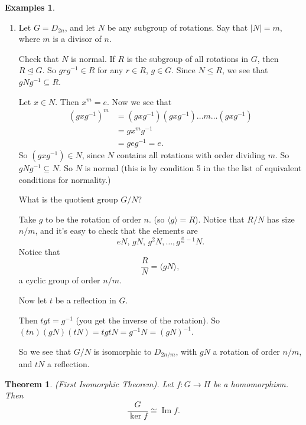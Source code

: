 \documentclass{article}
\newtheorem{theorem}{Theorem}
\theoremstyle{definition}
\newtheorem*{exmps}{Examples}
\newcommand{\gene}[1]{\langle #1 \rangle}
\newcommand{\func}[3]{#1 : #2 \rightarrow #3}
\newcommand{\ism}{\cong}
\DeclareMathOperator{\Ima}{Im}
\begin{document}
\begin{exmps}
\begin{enumerate}
     \item Let $G=D_{2n}$, and let $N$ be any subgroup of rotations. Say that $|N|=m$, where $m$ is a divisor of $n$.

       Check that $N$ is normal. If $R$ is the subgroup of all rotations in $G$, then $R \trianglelefteq G$. So $g r g^{-1} \in R$ for any $r \in R$, $g \in G$. Since $N \leq R$, we see that $g N g^{-1} \subseteq R$.

       Let $x \in N$. Then $x^m = e$. Now we see that 
       \begin{align*}
       \left( gxg^{-1} \right)^m &= (gxg^{-1})(gxg^{-1})\dots m \dots(gxg^{-1})\\
       &= gx^mg^{-1}\\
       &= geg^{-1} = e.
       \end{align*}
       So $(gxg^{-1})\in N$, since $N$ contains all rotations with order dividing $m$. So $gNg^{-1}\subseteq N$. So $N$ is normal (this is by condition 5 in the the list of equivalent conditions for normality.)

       What is the quotient group $G/N$?

       Take $g$ to be the rotation of order $n$. (so $\gene{g}=R$). Notice that  $R/N$ has size $n/m$, and it's easy to check that the elements are
       \[
         eN,\,gN,\,g^{2}N,\dots,g^{\frac{n}{m} - 1}N.
       \]
       Notice that 
       \[
         \frac{R}{N}=\gene{gN},
       \]
       a cyclic group of order $n/m$. 

       Now let $t$ be a reflection in $G$.

       Then $tgt=g^{-1}$ (you get the inverse of the rotation). So $(tn)(gN)(tN)=tgtN=g^{-1}N=(gN)^{-1}$.

       So we see that $G/N$ is isomorphic to $D_{2n/m}$, with $gN$ a rotation of order $n/m$, and $tN$ a reflection.
  \end{enumerate}
\end{exmps}

  \begin{theorem}
    (First Isomorphic Theorem). Let $\func{f}{G}{H}$ be a homomorphism. Then
    \[
      \frac{G}{\ker f} \ism \Ima f.
    \]
    \label{thm:firstisomorphic}
  \end{theorem}
\end{document}
